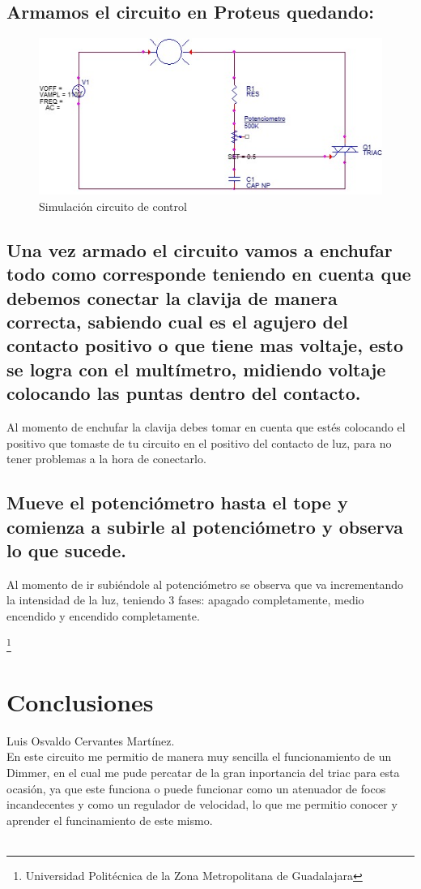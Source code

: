 \documentclass[10pt,a4paper]{article}
\begin{document}
\newpage
\subsection{Armamos el circuito en Proteus quedando:}
\begin{figure}[hbtp]
\centering
\includegraphics[scale=0.7]{Pictures/CIRCUITO.jpg}
\caption{Simulación circuito de control}
\end{figure}

\subsection{Una vez armado el circuito vamos a enchufar todo como corresponde teniendo en cuenta que debemos conectar la clavija de manera correcta, sabiendo cual es el agujero del contacto positivo o que tiene mas voltaje, esto se logra con el multímetro, midiendo voltaje colocando las puntas dentro del contacto.}
Al momento de enchufar la clavija debes tomar en cuenta que estés colocando el positivo que tomaste de tu circuito en el positivo del contacto de luz, para no tener problemas a la hora de conectarlo.

\subsection{Mueve el potenciómetro hasta el tope y comienza a subirle al potenciómetro y observa lo que sucede.}
Al momento de ir subiéndole al potenciómetro se observa que va incrementando la intensidad de la luz, teniendo 3 fases: apagado completamente, medio encendido y encendido completamente.

\footnote{Universidad Politécnica de la Zona Metropolitana de Guadalajara}

\newpage
\section{Conclusiones}
Luis Osvaldo Cervantes Martínez.\\
En este circuito me permitio de manera muy sencilla el funcionamiento de un Dimmer, en el cual me pude percatar de la gran inportancia del triac para esta ocasión, ya que este funciona o puede funcionar como un atenuador de focos incandecentes y como un regulador de velocidad, lo que me permitio conocer y aprender el funcinamiento de este mismo.\\\\
\end{document}
